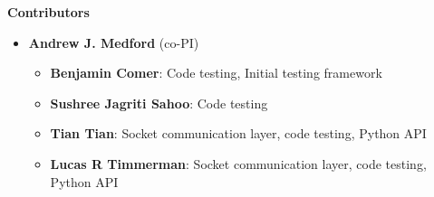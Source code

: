 \begin{frame}[allowframebreaks]{\textbf{Contributors}}
\begin{itemize}
    \item \textbf{Andrew J. Medford} (co-PI)
    \begin{itemize}
        \item \textbf{Benjamin Comer}: Code testing, Initial testing framework
        \item \textbf{Sushree Jagriti Sahoo}: Code testing
        \item \textbf{Tian Tian}: Socket communication layer, code testing, Python API
        \item \textbf{Lucas R Timmerman\footnotemark[2]}: Socket communication layer, code testing, Python API
    \end{itemize}
 	\end{itemize}
\end{frame}


